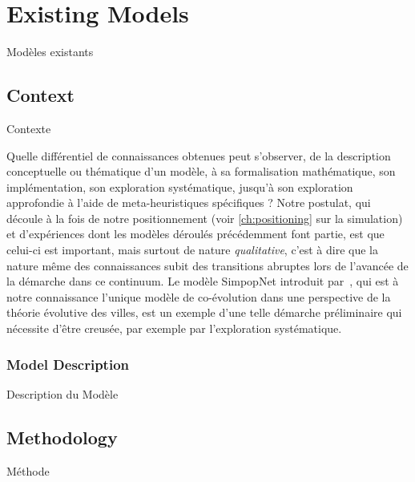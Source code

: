 




\newpage


\section[Existing Models][Modèles existants]{Existing Models}{Modèles existants}

\label{sec:macrocoevolexplo}




 

\subsection{Context}{Contexte}

Quelle différentiel de connaissances obtenues peut s'observer, de la description conceptuelle ou thématique d'un modèle, à sa formalisation mathématique, son implémentation, son exploration systématique, jusqu'à son exploration approfondie à l'aide de meta-heuristiques spécifiques ? Notre postulat, qui découle à la fois de notre positionnement (voir \autoref{ch:positioning} sur la simulation) et d'expériences dont les modèles déroulés précédemment font partie, est que celui-ci est important, mais surtout de nature \emph{qualitative}, c'est à dire que la nature même des connaissances subit des transitions abruptes lors de l'avancée de la démarche dans ce continuum. Le modèle SimpopNet introduit par~\cite{schmitt2014modelisation}, qui est à notre connaissance l'unique modèle de co-évolution dans une perspective de la théorie évolutive des villes, est un exemple d'une telle démarche préliminaire qui nécessite d'être creusée, par exemple par l'exploration systématique.


\subsubsection{Model Description}{Description du Modèle}





\subsection{Methodology}{Méthode}


